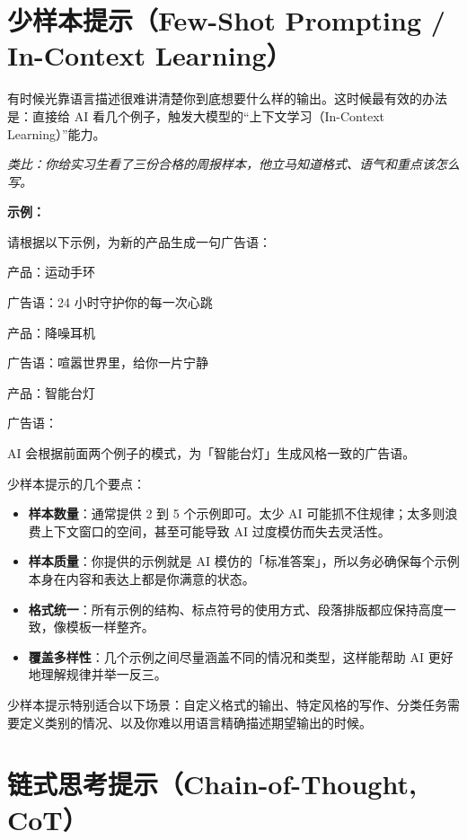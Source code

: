 \section{少样本提示（Few-Shot Prompting / In-Context Learning）}
\label{sec:few-shot}

有时候光靠语言描述很难讲清楚你到底想要什么样的输出。这时候最有效的办法是：直接给 AI 看几个例子，触发大模型的“上下文学习（In-Context Learning）”能力。

\textit{类比：你给实习生看了三份合格的周报样本，他立马知道格式、语气和重点该怎么写。}

\textbf{示例：}

\begin{promptbox}
请根据以下示例，为新的产品生成一句广告语：

产品：运动手环

广告语：24 小时守护你的每一次心跳

产品：降噪耳机

广告语：喧嚣世界里，给你一片宁静

产品：智能台灯

广告语：
\end{promptbox}

AI 会根据前面两个例子的模式，为「智能台灯」生成风格一致的广告语。

少样本提示的几个要点：

\begin{itemize}
  \item \textbf{样本数量}：通常提供 2 到 5 个示例即可。太少 AI 可能抓不住规律；太多则浪费上下文窗口的空间，甚至可能导致 AI 过度模仿而失去灵活性。
  \item \textbf{样本质量}：你提供的示例就是 AI 模仿的「标准答案」，所以务必确保每个示例本身在内容和表达上都是你满意的状态。
  \item \textbf{格式统一}：所有示例的结构、标点符号的使用方式、段落排版都应保持高度一致，像模板一样整齐。
  \item \textbf{覆盖多样性}：几个示例之间尽量涵盖不同的情况和类型，这样能帮助 AI 更好地理解规律并举一反三。
\end{itemize}

少样本提示特别适合以下场景：自定义格式的输出、特定风格的写作、分类任务需要定义类别的情况、以及你难以用语言精确描述期望输出的时候。

\section{链式思考提示（Chain-of-Thought, CoT）}
\label{sec:cot}

